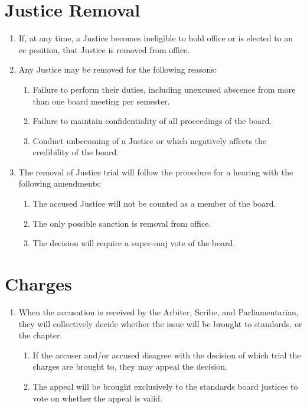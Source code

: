 \section{Justice Removal}
	\begin{enumerate}
		\item If, at any time, a Justice becomes ineligible to hold office or is elected to an \gls{ec} position, that Justice is removed from office.
		\item Any Justice may be removed for the following reasons:
			\begin{enumerate}
				\item Failure to perform their duties, including unexcused abscence from more than one board meeting per semester.
				\item Failure to maintain confidentiality of all proceedings of the board.
				\item Conduct unbecoming of a Justice or which negatively affects the credibility of the board.
			\end{enumerate}
		\item The removal of Justice trial will follow the procedure for a hearing with the following amendments:
			\begin{enumerate}
				\item The accused Justice will not be counted as a member of the board.
				\item The only possible sanction is removal from office.
				\item The decision will require a \gls{super-maj} vote of the board.
			\end{enumerate}
	\end{enumerate}

\section{Charges}

	\begin{enumerate}
		\item When the accusation is received by the Arbiter, Scribe, and Parliamentarian, they will collectively decide whether the issue will be brought to standards, or the chapter.

		\begin{enumerate}
			\item If the accuser and/or accused disagree with the decision of which trial the charges are brought to, they may appeal the decision.
			\item The appeal will be brought exclusively to the standards board justices to vote on whether the appeal is valid.
		\end{enumerate}

	\end{enumerate}

